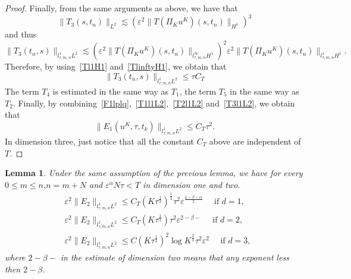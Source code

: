 \documentclass[10pt,a4paper]{article}
\newtheorem{lemma}[theorem]{Lemma}
\newtheorem{remark}[theorem]{Remark}
\begin{document}
\begin{proof}
    Finally, from the same arguments as above, we have that 
    \[ \|T_3(s,t_n)\|_{L^2}  \lesssim \left(\varepsilon^2\|T(\Pi_K u^K)(s, t_n) \|_{H^1}\right)^3 \]
    and thus 
    \[ \|T_3(t_n,s)\|_{l^1_{\tau,m,n}L^2} \lesssim \left(\varepsilon^2 
    \|T(\Pi_K u^K)(s,t_n)\|_{l^\infty_{\tau,m,n}H^1}\right)^2 \varepsilon^2 
    \|T(\Pi_K u^K)(s,t_n)\|_{l^1_{\tau,m,n}H^1}. \]
    Therefore, by using~\eqref{Tl1H1} and~\eqref{TlinftyH1}, we obtain that 
    \begin{equation}\label{T3l1L2}
      \|T_3(t_n,s)\|_{l^1_{\tau,m,n}L^2} \leq \tau C_T
    \end{equation}
    The term \(T_4\) is estimated in the same way as \(T_1\), the term \(T_5\)
    in the same way as \(T_2\). Finally, by combining~\eqref{F1lplq},~\eqref{T1l1L2},~\eqref{T2l1L2} 
    and~\eqref{T3l1L2}, we obtain that 
    \[
      \|E_1(u^K,\tau,t_k)\|_{l^1_{\tau,m,n}L^2} \leq C_T \tau^2.
    \]
    In dimension three, just notice that all the constant \(C_T\) above are
    independent of \(T\).
  \end{proof}


  \begin{lemma}\label{lemE2} %
    Under the same assumption of the previous lemma, we have  for every \(0 \leq
    m \leq n \),\(n = m+N\) and \(\varepsilon^\alpha N\tau < T\) in dimension one
    and two.
    \begin{align}
      &\label{E2d1} \varepsilon^2 \| E_2 \|_{l^1_{\tau,m,n}L^2} \leq C_T
      (K\tau^\frac12)^\frac12 \tau^2 \varepsilon^{\frac{4-\beta-\alpha}2} 
      \quad \text{ if } d=1,\\
      &\label{E2d2} \varepsilon^2 \| E_2 \|_{l^1_{\tau,m,n}L^2} \leq C_T 
      (K\tau^\frac12) \tau^2 \varepsilon^{2-\beta-}
      \quad \text{ if } d=2,\\
      &\label{E2d3} \varepsilon^2 \| E_2 \|_{l^1_{\tau,m,n}L^2} \leq C 
      (K\tau^\frac12)^2 \log{K}^\frac23 \tau^2 \varepsilon^2
      \quad \text{ if } d=3,
    \end{align}
    where \(2-\beta-\) in the estimate of dimension two means that any exponent
    less then \(2-\beta\).
  \end{lemma}

\end{document}
